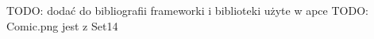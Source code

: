 \documentclass[printmode,pl]{mgr}
\begin{document}


\maketitle
TODO: dodać do bibliografii frameworki i biblioteki użyte w apce
TODO: Comic.png jest z Set14


\tableofcontents


%  
% 
% 
% 




\end{document}
